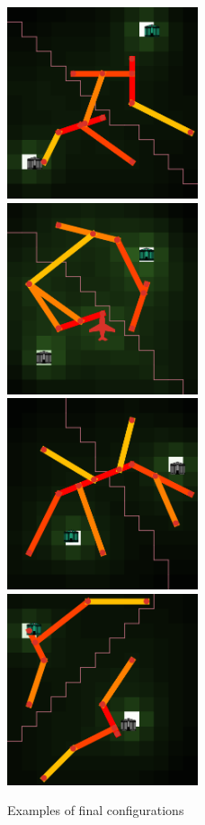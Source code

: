 \begin{figure}
\includegraphics[width=0.5\textwidth]{Figures/PartII/Modeling/Lutecia/ex_collab_0}
\includegraphics[width=0.5\textwidth]{Figures/PartII/Modeling/Lutecia/ex_dc_finalCollab}\\
\includegraphics[width=0.5\textwidth]{Figures/PartII/Modeling/Lutecia/ex_simpleNash_0}
\includegraphics[width=0.5\textwidth]{Figures/PartII/Modeling/Lutecia/example_nocollab_0}
\caption{Examples of final configurations}
\end{figure}


